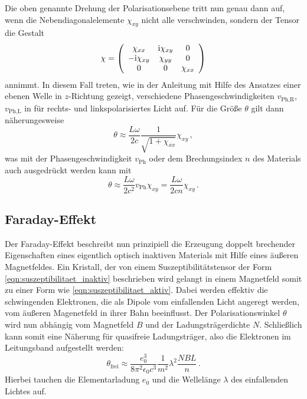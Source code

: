 Die oben genannte Drehung der Polarisationsebene tritt nun genau dann auf, wenn
die Nebendiagonalelemente $\chi_{xy}$ nicht alle verschwinden, sondern der
Tensor die Gestalt
\begin{equation}
    \label{eqn:suszeptibilitaet_inaktiv}
    \mathbf{\chi} =
    \left(\begin{array}{ccc}
        \chi_{xx}    & \mathrm{i}\chi_{xy} & 0 \\
        -\mathrm{i}\chi_{xy} & \chi_{yy}   & 0 \\
        0            & 0           & \chi_{xx} \\
    \end{array}\right)
\end{equation}
annimmt. In diesem Fall treten, wie in der Anleitung \cite{V46} mit Hilfe
des Ansatzes einer ebenen Welle in $z$-Richtung gezeigt, verschiedene
Phasengeschwindigkeiten $v_\text{Ph,R}$, $v_\text{Ph,L}$ in für rechts- und
linkspolarisiertes Licht auf.
Für die Größe $\theta$ gilt dann näherungesweise
\begin{equation}
    \label{eqn:theta_cirkular}
    \theta \approx \frac{L\omega}{2c}\frac{1}{\sqrt{1+\chi_{xx}}}\chi_{xy}\,,
\end{equation}
was mit der Phasengeschwindigkeit $v_\text{Ph}$ oder dem Brechungsindex $n$
des Materials auch ausgedrückt werden kann mit
\begin{equation}
    \label{eqn:theta_n}
    \theta
    \approx \frac{L\omega}{2c^2}v_\text{Ph}\chi_{xy}
    = \frac{L\omega}{2cn}\chi_{xy}\,.
\end{equation}

\subsection{Faraday-Effekt} %
\label{sub:faraday_effekt}
Der Faraday-Effekt beschreibt nun prinzipiell die Erzeugung doppelt brechender
Eigenschaften eines eigentlich optisch inaktiven Materials mit Hilfe eines
äußeren Magnetfeldes.
Ein Kristall, der von einem Suszeptibilitätstensor der Form
\eqref{eqn:suszeptibilitaet_inaktiv} beschrieben wird gelangt in einem
Magnetfeld somit zu einer Form wie \eqref{eqn:suszeptibilitaet_aktiv}.
Dabei werden effektiv die schwingenden Elektronen, die als Dipole vom
einfallenden Licht angeregt werden, vom äußeren Magenetfeld in ihrer
Bahn beeinflusst.
Der Polarisationswinkel $\theta$ wird nun abhängig vom Magnetfeld
$B$ und der Ladungsträgerdichte $N$.
Schließlich kann somit eine Näherung für quasifreie Ladungsträger,
also die Elektronen im Leitungsband aufgestellt werden:
\begin{equation}
    \label{eqn:theta_final}
    \theta_\text{frei}
    \approx \frac{e_0^3}{8\pi^2\epsilon_0 c^3}
    \frac{1}{m^2}\lambda^2 \frac{NBL}{n}\,.
\end{equation}
Hierbei tauchen die Elementarladung $e_0$ und die Wellelänge $\lambda$ des
einfallenden Lichtes auf.

